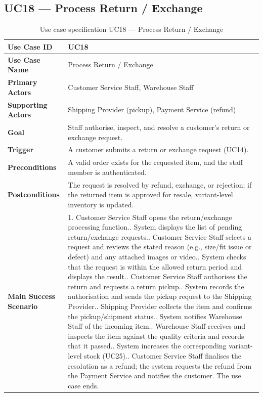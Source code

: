 \documentclass[11pt,a4paper,oneside]{extreport}
\newcommand{\ucrow}[2]{\textbf{#1} & #2 \\ \midrule}
\begin{document}
\subsection{UC18 --- Process Return / Exchange}
{\small
\begin{xltabular}{\textwidth}{@{}L{3.1cm} Y@{}}
\caption{Use case specification UC18 --- Process Return / Exchange}\label{tab:uc18}\\
\toprule
\endfirsthead
\toprule
\endhead
\bottomrule
\endlastfoot
\ucrow{Use Case ID}{UC18}
\ucrow{Use Case Name}{Process Return / Exchange}
\ucrow{Primary Actors}{Customer Service Staff, Warehouse Staff}
\ucrow{Supporting Actors}{Shipping Provider (pickup), Payment Service (refund)}
\ucrow{Goal}{Staff authorise, inspect, and resolve a customer's return or exchange request.}
\ucrow{Trigger}{A customer submits a return or exchange request (UC14).}
\ucrow{Preconditions}{A valid order exists for the requested item, and the staff member is authenticated.}
\ucrow{Postconditions}{The request is resolved by refund, exchange, or rejection; if the returned item is approved for resale, variant-level inventory is updated.}
\ucrow{Main Success Scenario}{%
1. Customer Service Staff opens the return/exchange processing function.\newline
2. System displays the list of pending return/exchange requests.\newline
3. Customer Service Staff selects a request and reviews the stated reason (e.g., size/fit issue or defect) and any attached images or video.\newline
4. System checks that the request is within the allowed return period and displays the result.\newline
5. Customer Service Staff authorises the return and requests a return pickup.\newline
6. System records the authorisation and sends the pickup request to the Shipping Provider.\newline
7. Shipping Provider collects the item and confirms the pickup/shipment status.\newline
8. System notifies Warehouse Staff of the incoming item.\newline
9. Warehouse Staff receives and inspects the item against the quality criteria and records that it passed.\newline
10. System increases the corresponding variant-level stock (UC25).\newline
11. Customer Service Staff finalises the resolution as a refund; the system requests the refund from the Payment Service and notifies the customer. The use case ends.}

\end{xltabular}}
\end{document}
